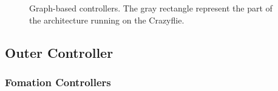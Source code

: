 \documentclass[a4paper, 12pt]{report}
\begin{document}
\begin{figure}[htbp]
\centering
{}
\hspace{0.2cm}
\caption{Graph-based controllers. The gray rectangle represent the part of the architecture running on the Crazyflie.}
\label{fig:controlArchi}
\end{figure}

\subsection{Outer Controller}
\subsubsection{Fomation Controllers}
\end{document}
